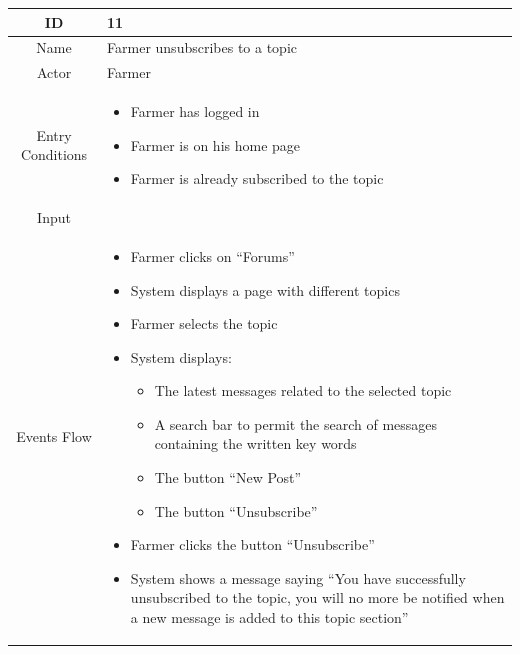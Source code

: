 \documentclass{article}
\begin{document}
\begin{center}
    \begin{longtable}{|c| p{10cm}|}
        \hline
            ID & 11 \\
        \hline
            Name & Farmer unsubscribes to a topic\\
        \hline
            Actor & Farmer \\
        \hline
            Entry Conditions & 
                                \begin{itemize}
                                    \item Farmer has logged in
                                    \item Farmer is on his home page
                                    \item Farmer is  already subscribed to the topic
                                \end{itemize}\\
        \hline
            Input & \\
        \hline
            Events Flow &   \begin{itemize}
                                \item Farmer clicks on “Forums”
                                \item System displays a page with different topics  
                                \item Farmer selects the topic
                                \item System displays:
                                            \begin{itemize}
                                                \item The latest messages related to the selected topic
                                                \item A search bar to permit the search of messages containing the written key words
                                                \item The button “New Post” 
                                                \item The button “Unsubscribe”
                                            \end{itemize}
                                \item Farmer clicks the button “Unsubscribe”
                                \item System shows a message saying “You have successfully unsubscribed to the topic, you will no more be notified when a new message is added to this topic section” 

\end{itemize}
\end{longtable}
\end{center}
\end{document}
